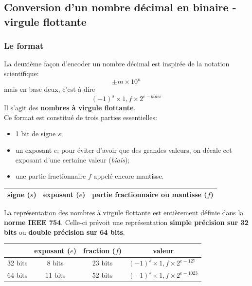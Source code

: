 \documentclass[11pt, french]{article}
\begin{document}
    \hypertarget{conversion-dun-nombre-duxe9cimal-en-binaire---virgule-flottante}{%
\subsection{Conversion d'un nombre décimal en binaire - virgule
flottante}\label{conversion-dun-nombre-duxe9cimal-en-binaire---virgule-flottante}}

\hypertarget{le-format}{%
\subsubsection{Le format}\label{le-format}}

La deuxième façon d'encoder un nombre décimal est inspirée de la
notation scientifique: $$\pm m\times 10^n$$ mais en base deux,
c'est-à-dire $$(-1)^s\times 1,f \times 2^{e-biais}$$ Il s'agit des
\textbf{nombres à virgule flottante}.\\
Ce format est constitué de trois parties essentielles:
\begin{itemize}
\item 1 bit de signe \(s\); 
\item un exposant $e$; pour éviter d'avoir que des grandes valeurs, on décale cet exposant d'une certaine valeur (\emph{biais});
\item une partie fractionnaire \(f\) appelé encore mantisse.
\end{itemize}

\begin{table}[h!]
\centering
\begin{tabular}{|l|l|l|}
\hline
signe ($s$) & exposant ($e$) & partie fractionnaire ou mantisse ($f$) \\ \hline
\end{tabular}
\end{table}

    La représentation des nombres à virgule flottante est entièrement
définie dans la \textbf{norme IEEE 754}. Celle-ci prévoit une représentation
\textbf{simple précision sur 32 bits} ou \textbf{double précision sur 64 bits}.

\begin{table}[h!]
\centering
\begin{tabular}{l|c|c|l|}
\cline{2-4}
                              & exposant ($e$) & fraction ($f$) & \multicolumn{1}{c|}{valeur}         \\ \hline
\multicolumn{1}{|l|}{32 bits} & 8 bits         & 23 bits        & $(-1)^s\times 1,f\times 2^{e-127}$  \\ \hline
\multicolumn{1}{|l|}{64 bits} & 11 bits        & 52 bits        & $(-1)^s\times 1,f\times 2^{e-1023}$ \\ \hline
\end{tabular}
\end{table}
\end{document}

